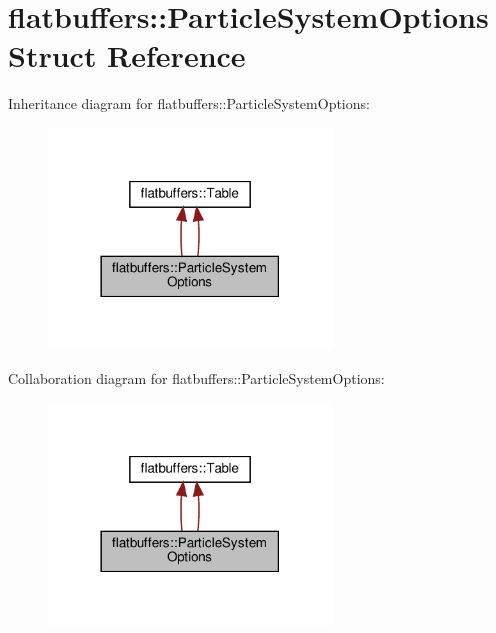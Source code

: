 \hypertarget{structflatbuffers_1_1ParticleSystemOptions}{}\section{flatbuffers\+:\+:Particle\+System\+Options Struct Reference}
\label{structflatbuffers_1_1ParticleSystemOptions}


Inheritance diagram for flatbuffers\+:\+:Particle\+System\+Options\+:
\nopagebreak
\begin{figure}[H]
\begin{center}
\leavevmode
\includegraphics[width=213pt]{structflatbuffers_1_1ParticleSystemOptions__inherit__graph}
\end{center}
\end{figure}


Collaboration diagram for flatbuffers\+:\+:Particle\+System\+Options\+:
\nopagebreak
\begin{figure}[H]
\begin{center}
\leavevmode
\includegraphics[width=213pt]{structflatbuffers_1_1ParticleSystemOptions__coll__graph}
\end{center}
\end{figure}
